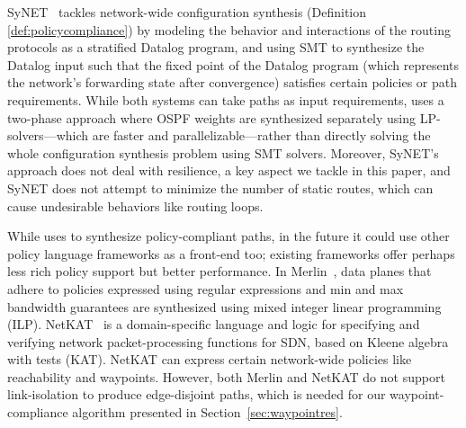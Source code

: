 SyNET~\cite{synet} tackles network-wide configuration synthesis
(Definition \ref{def:policycompliance}) by
modeling the behavior and interactions of the routing protocols as a
stratified Datalog program, and using SMT to synthesize the Datalog
input such that the fixed point of the Datalog program (which
represents the network's forwarding state after convergence) 
satisfies certain policies or path requirements.  While
both systems can take paths as input requirements, \name uses
a two-phase approach where OSPF weights are synthesized
separately using
LP-solvers---which are faster and parallelizable---rather than directly  
solving the whole configuration synthesis problem using SMT solvers.  
Moreover, SyNET's approach
does not deal with resilience, a key aspect we tackle in this paper,
and SyNET does not attempt to minimize the number of static routes,
which can cause undesirable behaviors like routing loops.  

 While \name uses \genesis 
to synthesize policy-compliant paths, in the future it could use
other policy language frameworks as a front-end
too; existing frameworks offer perhaps less rich policy support but better
performance. %
In Merlin~\cite{merlin}, data planes that adhere to policies expressed
using regular expressions and min and max
bandwidth guarantees are synthesized using mixed
integer linear programming (ILP). 
NetKAT~\cite{netkat} is a domain-specific language and logic for 
specifying and verifying network packet-processing functions
for SDN, based on Kleene algebra with tests (KAT). NetKAT can  
express certain network-wide policies like reachability and waypoints.
However, both Merlin and NetKAT do not support link-isolation 
to produce edge-disjoint paths, which is needed for  
our waypoint-compliance algorithm presented in Section~\ref{sec:waypointres}.




